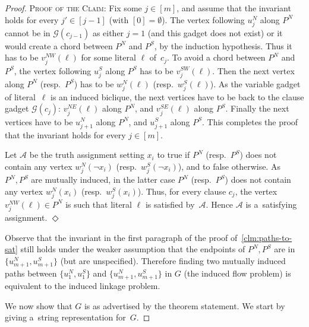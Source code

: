 \documentclass[a4paper,UKenglish,cleveref,autoref]{lipics-v2021}
\newenvironment{proofofclaim}{\noindent \textsc{Proof of the Claim:}}{\unskip\nobreak\hfill$\Diamond$\medskip}
\begin{document}
\begin{proof}
\begin{proofofclaim}
 Fix some $j \in [m]$, and assume that the invariant holds for every $j' \in [j-1]$ (with $[0] = \emptyset$).
 The vertex following $u^N_j$ along $P^N$ cannot be in $\mathcal G(c_{j-1})$ as either $j=1$ (and this gadget does not exist) or it would create a chord between $P^N$ and $P^S$, by the induction hypothesis.
 Thus it has to be $v_j^{NW}(\ell)$ for some literal $\ell$ of~$c_j$.
 To avoid a chord between $P^N$ and $P^S$, the vertex following $u^S_j$ along $P^S$ has to be $v_j^{SW}(\ell)$.
 Then the next vertex along $P^N$ (resp.~$P^S$) has to be $w_j^N(\ell)$ (resp.~$w_j^S(\ell)$).
 As the variable gadget of literal~$\ell$ is an induced biclique, the next vertices have to be back to the clause gadget $\mathcal G(c_j)$: $v_j^{NE}(\ell)$ along $P^N$, and $v_j^{SE}(\ell)$ along $P^S$.
 Finally the next vertices have to be $u^N_{j+1}$ along $P^N$, and $u^S_{j+1}$ along $P^S$.
 This completes the proof that the invariant holds for every $j \in [m]$. 

 Let $\mathcal A$ be the truth assignment setting $x_i$ to true if $P^N$ (resp.~$P^S$) does not contain any vertex $w^N_j(\neg x_i)$ (resp.~$w^S_j(\neg x_i)$), and to false otherwise.
 As $P^N, P^S$ are mutually induced, in the latter case $P^N$ (resp.~$P^S$) does not contain any vertex $w^N_j(x_i)$ (resp.~$w^S_j(x_i)$).
 Thus, for every clause $c_j$, the vertex $v_j^{NW}(\ell) \in P^N$ is such that literal $\ell$ is satisfied by~$\mathcal A$.
 Hence $\mathcal A$ is a~satisfying assignment. 
 \end{proofofclaim}

 Observe that the invariant in the first paragraph of the proof of~\cref{clm:paths-to-sat} still holds under the weaker assumption that the endpoints of $P^N, P^S$ are in $\{u^N_{m+1}, u^S_{m+1}\}$ (but are unspecified).
 Therefore finding two mutually induced paths between $\{u^N_1, u^S_1\}$ and $\{u^N_{m+1}, u^S_{m+1}\}$ in $G$ (the induced flow problem) is equivalent to the induced linkage problem. 

 We now show that $G$ is as advertised by the theorem statement.
 We start by giving a~string representation for~$G$.
 

\end{proof}
\end{document}
